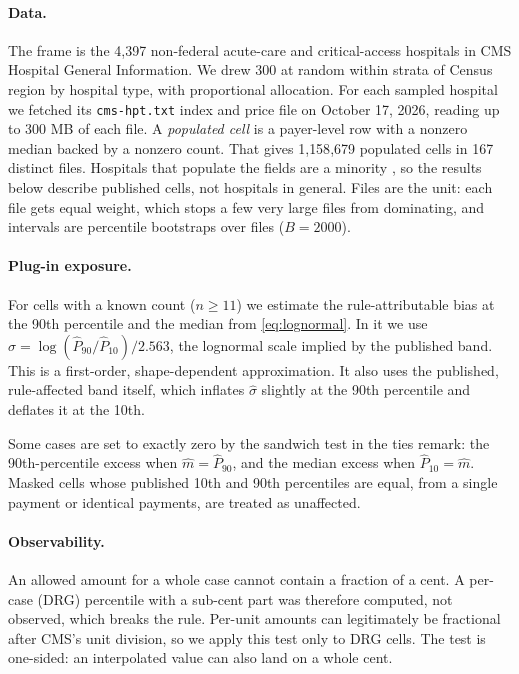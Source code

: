 \documentclass[11pt]{article}
\theoremstyle{remark}
\begin{document}
\paragraph{Data.} The frame is the 4{,}397 non-federal acute-care and critical-access hospitals in CMS Hospital General Information. We drew 300 at random within strata of Census region by hospital type, with proportional allocation. For each sampled hospital we fetched its \texttt{cms-hpt.txt} index and price file on October 17, 2026, reading up to 300 MB of each file. A \emph{populated cell} is a payer-level row with a nonzero median backed by a nonzero count. That gives 1{,}158{,}679 populated cells in 167 distinct files. Hospitals that populate the fields are a minority \citep{kff2026}, so the results below describe published cells, not hospitals in general. Files are the unit: each file gets equal weight, which stops a few very large files from dominating, and intervals are percentile bootstraps over files ($B=2000$).

\paragraph{Plug-in exposure.} For cells with a known count ($n\ge11$) we estimate the rule-attributable bias at the 90th percentile and the median from \eqref{eq:lognormal}. In it we use $\hat\sigma=\log(\hat P_{90}/\hat P_{10})/2.563$, the lognormal scale implied by the published band. This is a first-order, shape-dependent approximation. It also uses the published, rule-affected band itself, which inflates $\hat\sigma$ slightly at the 90th percentile and deflates it at the 10th.

Some cases are set to exactly zero by the sandwich test in the ties remark: the 90th-percentile excess when $\hat m=\hat P_{90}$, and the median excess when $\hat P_{10}=\hat m$. Masked cells whose published 10th and 90th percentiles are equal, from a single payment or identical payments, are treated as unaffected.

\paragraph{Observability.} An allowed amount for a whole case cannot contain a fraction of a cent. A per-case (DRG) percentile with a sub-cent part was therefore computed, not observed, which breaks the rule. Per-unit amounts can legitimately be fractional after CMS's unit division, so we apply this test only to DRG cells. The test is one-sided: an interpolated value can also land on a whole cent.
\end{document}
